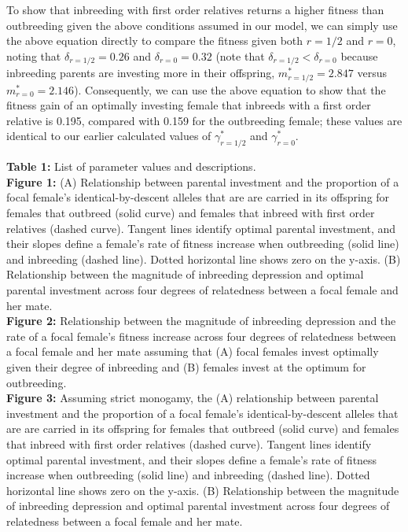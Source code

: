\documentclass[12pt]{article}
\begin{document}
To show that inbreeding with first order relatives returns a higher fitness than outbreeding given the above conditions assumed in our model, we can simply use the above equation directly to compare the fitness given both $r=1/2$ and $r=0$, noting that $\delta_{r=1/2}=0.26$ and $\delta_{r=0}=0.32$ (note that $\delta_{r=1/2}<\delta_{r=0}$ because inbreeding parents are investing more in their offspring, $m^{*}_{r=1/2}=2.847$ versus $m^{*}_{r=0}=2.146$). Consequently, we can use the above equation to show that the fitness gain of an optimally investing female that inbreeds with a first order relative is 0.195, compared with 0.159 for the outbreeding female; these values are identical to our earlier calculated values of $\gamma^{*}_{r=1/2}$ and $\gamma^{*}_{r=0}$.







\clearpage

\noindent \textbf{Table 1:}  List of parameter values and descriptions. \\

\noindent \textbf{Figure 1:} (A) Relationship between parental investment and the proportion of a focal female's identical-by-descent alleles that are are carried in its offspring for females that outbreed (solid curve) and females that inbreed with first order relatives (dashed curve). Tangent lines identify optimal parental investment, and their slopes define a female's rate of fitness increase when outbreeding (solid line) and inbreeding (dashed line). Dotted horizontal line shows zero on the y-axis. (B) Relationship between the magnitude of inbreeding depression and optimal parental investment across four degrees of relatedness between a focal female and her mate. \\ 

\noindent \textbf{Figure 2:} Relationship between the magnitude of inbreeding depression and the rate of a focal female's fitness increase across four degrees of relatedness between a focal female and her mate assuming that (A) focal females invest optimally given their degree of inbreeding and (B) females invest at the optimum for outbreeding. \\

\noindent \textbf{Figure 3:} Assuming strict monogamy, the (A) relationship between parental investment and the proportion of a focal female's identical-by-descent alleles that are are carried in its offspring for females that outbreed (solid curve) and females that inbreed with first order relatives (dashed curve). Tangent lines identify optimal parental investment, and their slopes define a female's rate of fitness increase when outbreeding (solid line) and inbreeding (dashed line). Dotted horizontal line shows zero on the y-axis. (B) Relationship between the magnitude of inbreeding depression and optimal parental investment across four degrees of relatedness between a focal female and her mate. \\
\end{document}
